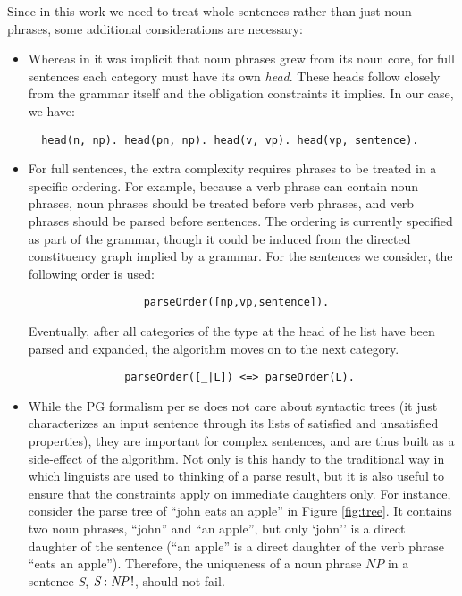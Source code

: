 \documentclass{llncs}
\newcommand{\uniqueness}[2]{\textit{#1} : \textit{#2}\,!}
\newcommand{\NP}{\textit{NP}\xspace}
\newcommand{\Se}{\textit{S}\xspace}
\begin{document}
Since in this work we need to treat whole sentences rather than just noun phrases, some additional considerations are necessary:
\begin{itemize}
  \item Whereas in \cite {DM12} it was implicit that noun phrases grew from its noun core, for full sentences each category must have its own \emph{head}. These heads follow closely from the grammar itself and the obligation constraints it implies. In our case, we have:
\begin{verbatim}  head(n, np). head(pn, np). head(v, vp). head(vp, sentence).\end{verbatim}
  
  \item For full sentences, the extra complexity requires phrases to be treated in a specific ordering. For example, because a verb phrase can contain noun phrases, noun phrases should be treated before verb phrases, and verb phrases should be parsed before sentences. The ordering is currently specified as part of the grammar, though it could be induced from the directed constituency graph implied by a grammar. For the sentences we consider, the following order is used:
\begin{verbatim}                  parseOrder([np,vp,sentence]).\end{verbatim}

Eventually, after all categories of the type at the head of he list have been parsed and expanded, the algorithm moves on to the next category.
\begin{verbatim}               parseOrder([_|L]) <=> parseOrder(L).
\end{verbatim}
  
  \item While the PG formalism per se does not care about syntactic trees (it just characterizes an input sentence through its lists of satisfied and unsatisfied properties), they are important for complex sentences, and are thus built as a side-effect of the algorithm. Not only is this handy to the traditional way in which linguists are used to thinking of a parse result, but it is also useful to ensure that the constraints apply on immediate daughters only. For instance, consider the parse tree of ``john eats an apple'' in Figure \ref{fig:tree}. It contains two noun phrases, ``john'' and ``an apple'', but only `john'' is a direct daughter of the sentence (``an apple'' is a direct daughter of the verb phrase ``eats an apple''). Therefore, the uniqueness of a noun phrase $\NP$ in a sentence \Se, $\uniqueness{\Se}{\NP}$, should not fail.


\end{itemize}
\end{document}
